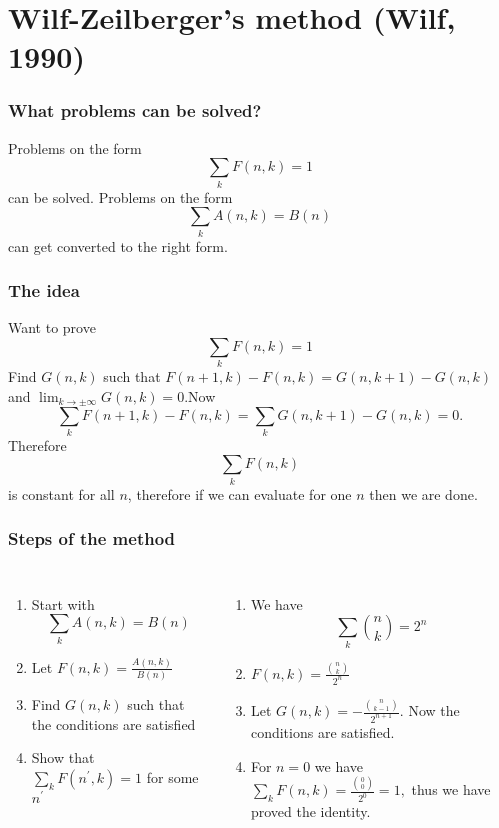 \documentclass{beamer}
\begin{document}
\section[Wilf-Zeilberger's method]{Wilf-Zeilberger's method (Wilf, 1990)}
\begin{frame}
  \frametitle{What problems can be solved?}
  Problems on the form
  $$\sum_k F(n,k)=1$$
  can be solved.
  \pause
  Problems on the form
  $$\sum_k A(n,k)=B(n)$$
  can get converted to the right form.
\end{frame}
\begin{frame}
  \frametitle{The idea}
  Want to prove
  \begin{equation*}\label{Eq: WZ1}
    \sum_k F(n,k)=1
  \end{equation*}
  \pause
  Find $G(n,k)$ such that $F(n+1,k)-F(n,k)=G(n,k+1)-G(n,k)$ and $\lim_{k\to\pm\infty} G(n,k)=0$.\pause Now $$\sum_k F(n+1,k)-F(n,k)=\sum_k G(n,k+1)-G(n,k)=0.$$\pause Therefore $$\sum_k F(n,k)$$ is constant for all $n$, therefore if we can evaluate for one $n$ then we are done.
\end{frame}
\begin{frame}
  \frametitle{Steps of the method}
  \begin{columns}[t]

  \begin{enumerate}
    \item<1-> Start with $$\sum_k A(n,k)=B(n)$$
    \item<3-> Let $F(n,k)=\frac{A(n,k)}{B(n)}$
    \item<5-> Find $G(n,k)$ such that the conditions are satisfied
    \item<7-> Show that $\sum_k F(n^\prime,k)=1$ for some $n^\prime$
  \end{enumerate}

  \begin{enumerate}
    \item<2-> We have $$\sum_k \binom{n}{k}=2^n$$
    \item<4-> $F(n,k)=\frac{\binom{n}{k}}{2^n}$
    \item<6-> Let $G(n,k)=-\frac{\binom{n}{k-1}}{2^{n+1}}$. Now the conditions are satisfied.
    \item<8-> For $n=0$ we have $\sum_k F(n,k)=\frac{\binom{0}{0}}{2^0}=1,$ thus we have proved the identity.
  \end{enumerate}
  \end{columns}
\end{frame}
\end{document}
